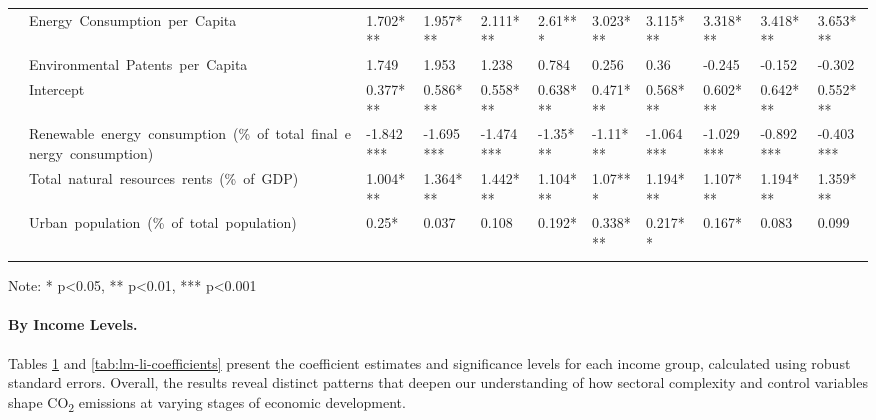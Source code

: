 \documentclass[10pt]{article}
\begin{document}
\begin{table}[ht]
\begin{adjustbox}{width=\textwidth,center}
\begin{tabular}{lllllllllll}
      & Energy\ Consumption\ per\ Capita & 1.702*** & 1.957*** & 2.111*** & 2.61*** & 3.023*** & 3.115*** & 3.318*** & 3.418*** & 3.653*** \\
      & Environmental\ Patents\ per\ Capita & 1.749 & 1.953 & 1.238 & 0.784 & 0.256 & 0.36 & -0.245 & -0.152 & -0.302 \\
      & Intercept & 0.377*** & 0.586*** & 0.558*** & 0.638*** & 0.471*** & 0.568*** & 0.602*** & 0.642*** & 0.552*** \\
      & Renewable\ energy\ consumption\ (\%\ of\ total\ final\ energy\ consumption) & -1.842*** & -1.695*** & -1.474*** & -1.35*** & -1.11*** & -1.064*** & -1.029*** & -0.892*** & -0.403*** \\
      & Total\ natural\ resources\ rents\ (\%\ of\ GDP) & 1.004*** & 1.364*** & 1.442*** & 1.104*** & 1.07*** & 1.194*** & 1.107*** & 1.194*** & 1.359*** \\
      & Urban\ population\ (\%\ of\ total\ population) & 0.25* & 0.037 & 0.108 & 0.192* & 0.338*** & 0.217** & 0.167* & 0.083 & 0.099 \\
            \cline{1-11}
      \bottomrule
      \label{tab:high-um-coefficients}
      \end{tabular}
      \end{adjustbox}
      {\centering\tiny Note: * p\textless0.05, ** p\textless0.01, *** p\textless0.001\par}
      \hfill
\end{table}

\paragraph{By Income Levels.}
Tables \ref{tab:high-um-coefficients} and \ref{tab:lm-li-coefficients} present the coefficient estimates and significance levels for each income group, calculated using robust standard errors. Overall, the results reveal distinct patterns that deepen our understanding of how sectoral complexity and control variables shape CO\textsubscript{2} emissions at varying stages of economic development.
\end{document}
